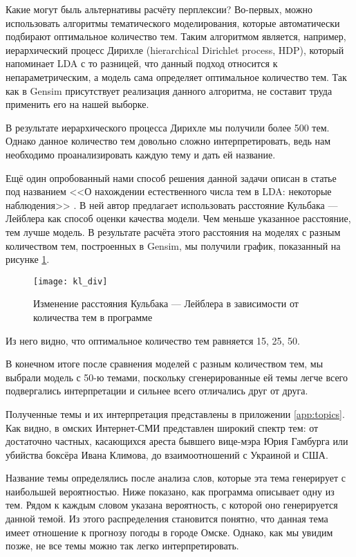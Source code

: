 Какие могут быль альтернативы расчёту перплексии? Во-первых, можно использовать алгоритмы тематического моделирования, которые автоматически подбирают оптимальное количество тем. Таким алгоритмом является, например, иерархический процесс Дирихле (hierarchical Dirichlet process, HDP), который напоминает LDA с то разницей, что данный подход относится к непараметрическим, а модель сама определяет оптимальное количество тем. Так как в Gensim присутствует реализация данного алгоритма, не составит труда применить его на нашей выборке.

В результате иерархического процесса Дирихле мы получили более 500 тем. Однако данное количество тем довольно сложно  интерпретировать, ведь нам необходимо проанализировать каждую тему и дать ей название.

Ещё один опробованный нами способ решения данной задачи описан в статье под названием <<О нахождении естественного числа тем в LDA: некоторые наблюдения>> \cite{Arun_KL}. В ней автор предлагает использовать  расстояние Кульбака — Лейблера как способ оценки качества модели. Чем меньше указанное расстояние, тем лучше модель. В результате расчёта этого расстояния на моделях с разным количеством тем, построенных в Gensim, мы получили график, показанный на рисунке \ref{fig:kl_div}.

\begin{figure}
	\centering
    \texttt{[image: kl\_div]}
    \caption{Изменение расстояния Кульбака — Лейблера в зависимости от количества тем в программе}
    \label{fig:kl_div}
\end{figure}

Из него видно, что оптимальное количество тем равняется 15, 25, 50.

В конечном итоге после сравнения моделей с разным количеством тем, мы выбрали модель с 50-ю темами, поскольку сгенерированные ей темы легче всего подвергались интерпретации и сильнее всего отличались друг от друга.

Полученные темы и их интерпретация представлены в приложении \ref{app:topics}. Как видно, в омских Интернет-СМИ представлен широкий спектр тем: от достаточно частных, касающихся ареста бывшего вице-мэра Юрия Гамбурга или убийства боксёра Ивана Климова, до взаимоотношений с Украиной и США.

Название темы определялись после анализа слов, которые эта тема генерирует с наибольшей вероятностью. Ниже показано, как программа описывает одну из тем. Рядом к каждым словом указана вероятность, с которой оно генерируется данной темой. Из этого распределения становится понятно, что данная тема имеет отношение к прогнозу погоды в городе Омске. Однако, как мы увидим позже, не все темы можно так легко интерпретировать.

